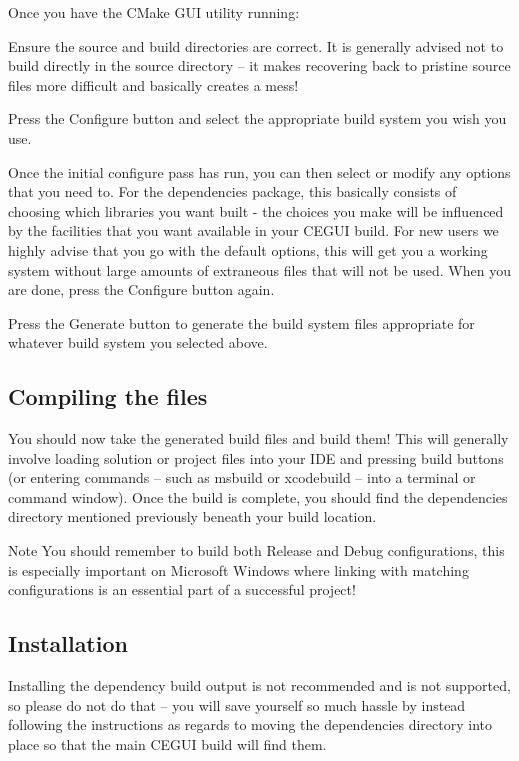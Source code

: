 Once you have the C\+Make G\+UI utility running\+:
\begin{DoxyItemize}
\item Ensure the source and build directories are correct. It is generally advised not to build directly in the source directory – it makes recovering back to \textquotesingle{}pristine\textquotesingle{} source files more difficult and basically creates a mess!
\item Press the Configure button and select the appropriate build system you wish you use.
\item Once the initial configure pass has run, you can then select or modify any options that you need to. For the dependencies package, this basically consists of choosing which libraries you want built -\/ the choices you make will be influenced by the facilities that you want available in your C\+E\+G\+UI build. For new users we highly advise that you go with the default options, this will get you a working system without large amounts of extraneous files that will not be used. When you are done, press the Configure button again.
\item Press the Generate button to generate the build system files appropriate for whatever build system you selected above. 
\end{DoxyItemize}\hypertarget{building_deps_building_deps_compilation_build}{}\subsection{Compiling the files}\label{building_deps_building_deps_compilation_build}
You should now take the generated build files and build them! This will generally involve loading solution or project files into your I\+DE and pressing build buttons (or entering commands -- such as {\ttfamily msbuild} or {\ttfamily xcodebuild} -- into a terminal or command window). Once the build is complete, you should find the {\ttfamily dependencies} directory mentioned previously beneath your build location. \begin{DoxyNote}{Note}
You should remember to build both Release and Debug configurations, this is especially important on Microsoft Windows where linking with matching configurations is an essential part of a successful project! 
\end{DoxyNote}
\hypertarget{compiling_compiling_build_install}{}\subsection{Installation}\label{compiling_compiling_build_install}
Installing the dependency build output is not recommended and is not supported, so please do not do that -- you will save yourself so much hassle by instead following the instructions as regards to moving the {\ttfamily dependencies} directory into place so that the main C\+E\+G\+UI build will find them. 